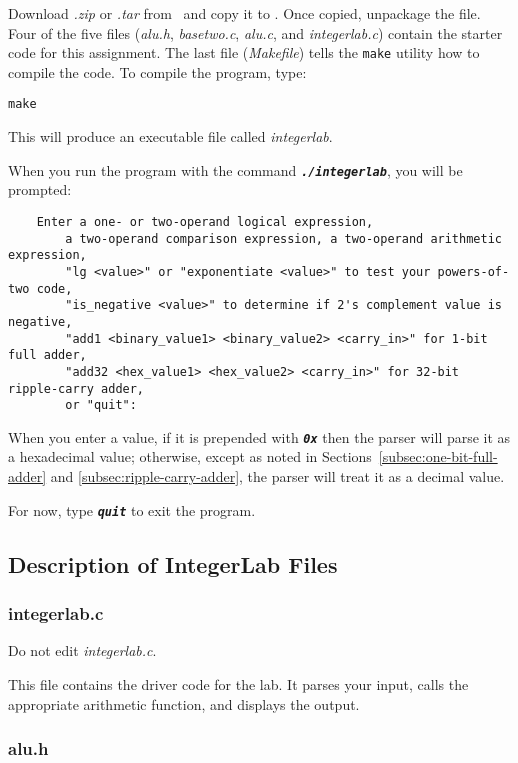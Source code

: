 Download \textit{\shortlabname.zip} or \textit{\shortlabname.tar} from \filesource\ and copy it to \runtimeenvironment.
Once copied, unpackage the file.
Four of the five files (\textit{alu.h}, \textit{basetwo.c}, \textit{alu.c}, and \textit{integerlab.c}) contain the starter code for this assignment.
The last file (\textit{Makefile}) tells the \texttt{make} utility how to compile the code.
To compile the program, type:

\texttt{make}

This will produce an executable file called \textit{integerlab}.

When you run the program with the command \texttt{\textbf{\textit{./integerlab}}}, you will be prompted:

\begin{verbatim}
    Enter a one- or two-operand logical expression,
        a two-operand comparison expression, a two-operand arithmetic expression,
        "lg <value>" or "exponentiate <value>" to test your powers-of-two code,
        "is_negative <value>" to determine if 2's complement value is negative,
        "add1 <binary_value1> <binary_value2> <carry_in>" for 1-bit full adder,
        "add32 <hex_value1> <hex_value2> <carry_in>" for 32-bit ripple-carry adder,
        or "quit":
\end{verbatim}

When you enter a value, if it is prepended with \texttt{\textbf{\textit{0x}}} then the parser will parse it as a hexadecimal value;
otherwise, except as noted in Sections~\ref{subsec:one-bit-full-adder} and \ref{subsec:ripple-carry-adder}, the parser will treat it as a decimal value.

For now, type \texttt{\textbf{\textit{quit}}} to exit the program.

\subsection{Description of IntegerLab Files}

\subsubsection{integerlab.c}

Do not edit \textit{integerlab.c}.

This file contains the driver code for the lab.
It parses your input, calls the appropriate arithmetic function, and displays the output.

\subsubsection{alu.h} \label{subsubsec:alu.h}

